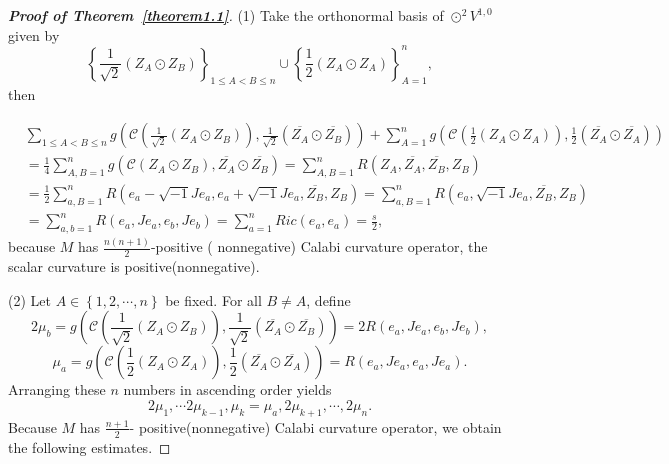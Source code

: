 \documentclass[10pt,a4paper]{amsart}
\begin{document}
\begin{proof}[{\bf Proof of Theorem~\ref{theorem1.1}}]
(1) Take the orthonormal basis of ${ \odot ^2}{V^{1,0}}$ given by $${\left\{ {\frac{1}{{\sqrt 2 }}\left( {{Z_A} \odot {Z_B}} \right)} \right\}_{1 \le A < B \le n}} \cup \left\{ {\frac{1}{2}\left( {{Z_A} \odot {Z_A}} \right)} \right\}_{A = 1}^n,$$ then

\begin{align*}
  &\sum\limits_{1 \le A < B \le n}^{} {g\left( {\mathcal{C} \left( {\frac{1}{{\sqrt 2 }}\left( {{Z_A} \odot {Z_B}} \right)} \right),\frac{1}{{\sqrt 2 }}\left( {\overline {{Z_A}}  \odot \overline {{Z_B}} } \right)} \right)}  + \sum\limits_{A = 1}^n {g\left( {\mathcal{C}\left( {\frac{1}{2}\left( {{Z_A} \odot {Z_A}} \right)} \right),\frac{1}{2}\left( {\overline {{Z_A}}  \odot \overline {{Z_A}} } \right)} \right)}  \\
  &= \frac{1}{4}\sum\limits_{A,B = 1}^n {g\left( {\mathcal{C}\left( {{Z_A} \odot {Z_B}} \right),\overline {{Z_A}}  \odot \overline {{Z_B}} } \right)}  =\sum\limits_{A,B = 1}^n {R\left( {{Z_A},\overline {{Z_A}} ,\overline {{Z_B}} ,{Z_B}} \right)}\\
   &=\frac{1}{2}\sum\limits_{a,B = 1}^n {R\left( {{e_a} - \sqrt { - 1} J{e_a},{e_a} + \sqrt { - 1} J{e_a},\overline {{Z_B}} ,{Z_B}} \right)}
   = \sum\limits_{a,B = 1}^n {R\left( {{e_a},\sqrt { - 1} J{e_a},\overline {{Z_B}} ,{Z_B}} \right)} \\
   &= \sum\limits_{a,b = 1}^n {R\left( {{e_a},J{e_a},{e_b},J{e_b}} \right)}
   = \sum\limits_{a = 1}^n {Ric\left( {{e_a},{e_a}} \right)}
   =\frac{s}{2} ,
\end{align*}
because $M$ has $\frac{{n\left( {n + 1} \right)}}{2}$-positive ( nonnegative) Calabi curvature operator,  the scalar curvature is positive(nonnegative).

(2) Let $A \in \left\{ {1,2, \cdots ,n} \right\}$ be fixed. For all $B \ne A$, define
$$2{\mu _b}=g\left( {\mathcal{C}\left( {\frac{1}{{\sqrt 2 }}\left( {{Z_A} \odot {Z_B}} \right)} \right),\frac{1}{{\sqrt 2 }}\left( {\overline {{Z_A}}  \odot \overline {{Z_B}} } \right)} \right) = 2R\left( {{e_a},J{e_a},{e_b},J{e_b}} \right),$$
$${\mu _a}=g\left( {\mathcal{C}\left( {\frac{1}{2}\left( {{Z_A} \odot {Z_A}} \right)} \right),\frac{1}{2}\left( {\overline {{Z_A}}  \odot \overline {{Z_A}} } \right)} \right) = R\left( {{e_a},J{e_a},{e_a},J{e_a}} \right).$$
Arranging these $n$ numbers in ascending order yields
$$2{\mu _1}, \cdots 2{\mu _{k - 1}},{\mu _k} = {\mu _a},2{\mu _{k + 1}}, \cdots, 2{\mu _n}.$$
Because $M$ has $\frac{n+1}{2}$- positive(nonnegative) Calabi curvature operator, we obtain the following estimates.


\end{proof}
\end{document}
